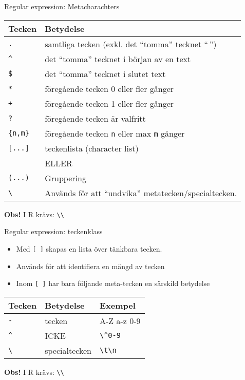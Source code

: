 \documentclass[
  11pt,
  ignorenonframetext,
  handout]{beamer}
\providecommand{\tightlist}{%
  \setlength{\itemsep}{0pt}\setlength{\parskip}{0pt}}
\begin{document}
\begin{frame}[fragile]{Regular expression: Metacharachters}
\protect\hypertarget{regular-expression-metacharachters}{}
\begin{longtable}[]{@{}ll@{}}
\toprule
Tecken & Betydelse \\
\midrule
\endhead
\texttt{.} & samtliga tecken (exkl. det ``tomma'' tecknet ``\,'') \\
\texttt{\^{}} & det ``tomma'' tecknet i början av en text \\
\texttt{\$} & det ``tomma'' tecknet i slutet text \\
\texttt{*} & föregående tecken 0 eller fler gånger \\
\texttt{+} & föregående tecken 1 eller fler gånger \\
\texttt{?} & föregående tecken är valfritt \\
\texttt{\{n,m\}} & föregående tecken \texttt{n} eller max \texttt{m}
gånger \\
\texttt{{[}...{]}} & teckenlista (character list) \\
\textbar{} & ELLER \\
\texttt{(...)} & Gruppering \\
\texttt{\textbackslash{}} & Används för att ``undvika''
metatecken/specialtecken. \\
\bottomrule
\end{longtable}

\textbf{Obs!} I R krävs: \texttt{\textbackslash{}\textbackslash{}}
\end{frame}

\begin{frame}[fragile]{Regular expression: teckenklass}
\protect\hypertarget{regular-expression-teckenklass}{}
\begin{itemize}
\tightlist
\item
  Med \texttt{{[}\ {]}} skapas en lista över tänkbara tecken.
\item
  Används för att identifiera en mängd av tecken
\item
  Inom \texttt{{[}\ {]}} har bara följande meta-tecken en särskild
  betydelse
\end{itemize}

\begin{longtable}[]{@{}lll@{}}
\toprule
Tecken & Betydelse & Exempel \\
\midrule
\endhead
\texttt{-} & tecken & A-Z a-z 0-9 \\
\texttt{\^{}} & ICKE & \texttt{\textbackslash{}\^{}0-9} \\
\texttt{\textbackslash{}} & specialtecken &
\texttt{\textbackslash{}t\textbackslash{}n} \\
\bottomrule
\end{longtable}

\textbf{Obs!} I R krävs: \texttt{\textbackslash{}\textbackslash{}}
\end{frame}
\end{document}
